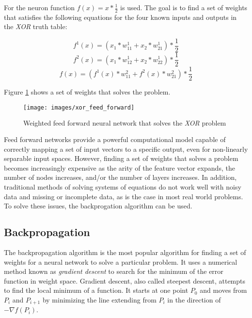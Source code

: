 For the neuron function $f(x) = x * \frac{1}{2}$ is used.
The goal is to find a set of weights that satisfies the following
equations for the four known inputs and outputs in the {\it XOR} truth
table:

\begin{displaymath}
f^1(x) = (x_1 * w_{11}^1 + x_2 * w_{21}^1) * \frac{1}{2}
\end{displaymath}
\begin{displaymath}
f^2(x) = (x_1 * w_{12}^1 + x_2 * w_{22}^1) * \frac{1}{2}
\end{displaymath}
\begin{displaymath}
f(x) = (f^1(x) * w_{11}^2 + f^2(x) * w_{21}^2) * \frac{1}{2}
\end{displaymath}

Figure \ref{xff} shows a set of weights that solves the problem.

\begin{figure}[h!]
  \centering
  \texttt{[image: images/xor\_feed\_forward]}
  \caption{Weighted feed forward neural network that solves the {\it XOR}
    problem}
  \label{xff}
\end{figure}

Feed forward networks provide a powerful computational model capable
of correctly mapping a set of input vectors to a specific output, even
for non-linearly separable input spaces.
However, finding a set of weights that solves a problem becomes increasingly expensive as the arity of the feature
vector expands, the number of nodes increases, and/or the number of layers
increases.
In addition, traditional methods of solving systems of equations do not work
well with noisy data and missing or incomplete data, as is the case in most real world problems.
To solve these issues, the backprogation algorithm can be used.

\subsection{Backpropagation}

The backpropagation algorithm is the most popular algorithm for
finding a set of weights for a neural network to solve a particular
problem.
It uses a numerical method known as {\it gradient descent} to search
for the minimum of the error function in weight space.
Gradient descent, also called steepest descent, attempts to find the
local minimum of a function.
It starts at one point $P_0$ and moves from $P_i$ and $P_{i+1}$ by
minimizing the line extending from $P_i$ in the direction of $- \nabla
f(P_i)$\cite{gradient}.

